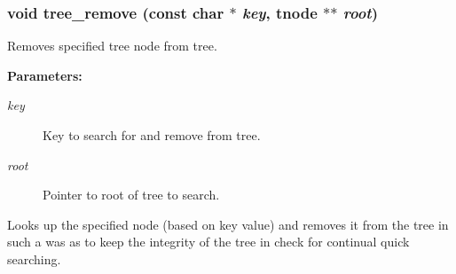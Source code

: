 \subsubsection{\setlength{\rightskip}{0pt plus 5cm}void tree\_\-remove (const char $\ast$ {\em key}, {\bf tnode} $\ast$$\ast$ {\em root})}\label{tree_8h_a2}


Removes specified tree node from tree.

\begin{Desc}
\item[{\bf Parameters: }]\par
\begin{description}
\item[
{\em key}]Key to search for and remove from tree. \item[
{\em root}]Pointer to root of tree to search.

\end{description}
\end{Desc}
Looks up the specified node (based on key value) and removes it from the tree in such a was as to keep the integrity of the tree in check for continual quick searching. 